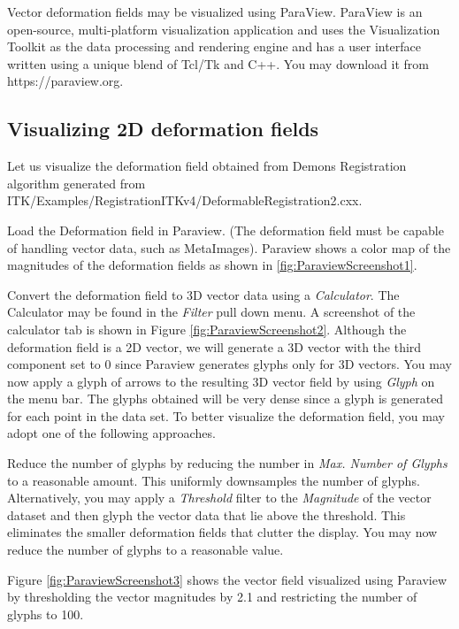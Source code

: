 %
%
%
%
%
%
Vector deformation fields may be visualized using ParaView.
ParaView \cite{ParaviewBook} is an open-source, multi-platform visualization application and uses the Visualization Toolkit as the data processing and rendering engine and has a user interface written using a unique blend of Tcl/Tk and C++. You may download it from https://paraview.org.

\subsection{Visualizing 2D deformation fields}
Let us visualize the deformation field obtained from Demons Registration algorithm generated from ITK/Examples/RegistrationITKv4/DeformableRegistration2.cxx.

Load the Deformation field in Paraview. (The deformation field must be capable of handling vector data, such as MetaImages). Paraview shows a color map of the magnitudes of the deformation fields as shown in \ref{fig:ParaviewScreenshot1}.

Convert the deformation field to 3D vector data using a {\it Calculator}. The Calculator may be found in the {\it Filter} pull down menu. A screenshot of the calculator tab is shown in Figure \ref{fig:ParaviewScreenshot2}. Although the deformation field is a 2D vector, we will generate a 3D vector with the third component set to 0 since Paraview generates glyphs only for 3D vectors. You may now apply a glyph of arrows to the resulting 3D vector field by using {\it Glyph} on the menu bar. The glyphs obtained will be very dense since a glyph is generated for each point in the data set. To better visualize the deformation field, you may adopt one of the following approaches.

Reduce the number of glyphs by reducing the number in {\it Max. Number of Glyphs} to a reasonable amount. This uniformly downsamples the number of glyphs. Alternatively, you may apply a {\it Threshold} filter to the {\it Magnitude} of the vector dataset and then glyph the vector data that lie above the threshold. This eliminates the smaller deformation fields that clutter the display. You may now reduce the number of glyphs to a reasonable value.

Figure \ref{fig:ParaviewScreenshot3} shows the vector field visualized using Paraview by thresholding the vector magnitudes by 2.1 and restricting the number of glyphs to 100.

